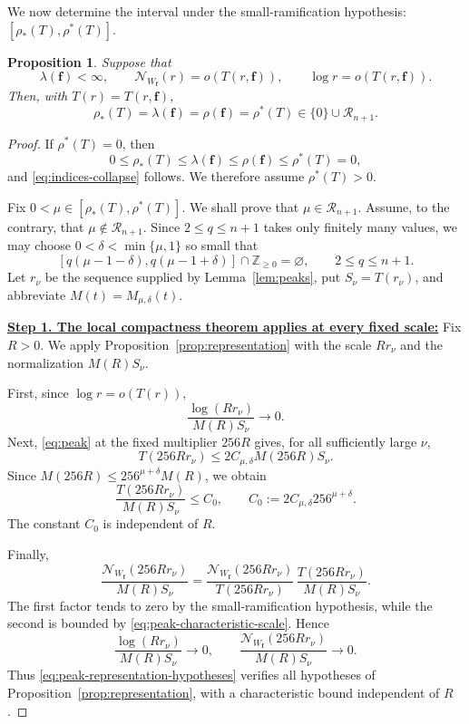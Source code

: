\documentclass[12pt,letterpaper,reqno]{amsart}
\newtheorem{prop}[thm]{Proposition}
\theoremstyle{definition}
\numberwithin{equation}{section}
\newcommand{\Z}{\mathbb Z}
\newcommand{\NN}{\mathcal N}
\newcommand{\Gn}{\mathcal R_{n+1}}
\newcommand{\fv}{\bm f}
\begin{document}
We now determine the interval under the small-ramification hypothesis:
$
[\rho_*(T),\rho^*(T)].
$

\begin{prop}\label{prop:indices}
Suppose that
\[
\lambda(\fv)<\infty,
\qquad
\NN_{W_{\fv}}(r)=o(T(r,\fv)),
\qquad
\log r=o(T(r,\fv)).
\]
Then, with \(T(r)=T(r,\fv)\),
\begin{equation}\label{eq:indices-collapse}
 \rho_*(T)
 =
 \lambda(\fv)
 =
 \rho(\fv)
 =
 \rho^*(T)
 \in
 \{0\}\cup\Gn.
\end{equation}
\end{prop}

\begin{proof}

If \(\rho^*(T)=0\), then
\[
0\leq
\rho_*(T)
\leq
\lambda(\fv)
\leq
\rho(\fv)
\leq
\rho^*(T)=0,
\]
and \eqref{eq:indices-collapse} follows. We therefore assume
\(\rho^*(T)>0\).

Fix
$
0<\mu\in[\rho_*(T),\rho^*(T)].
$
We shall prove that \(\mu\in\Gn\).
Assume, to the contrary, that \(\mu\notin\Gn\). Since
\(2\leq q\leq n+1\) takes only finitely many values, we may choose
\(0<\delta<\min\{\mu,1\}\) so small that
\begin{equation}\label{eq:no-integer-window}
 [q(\mu-1-\delta),q(\mu-1+\delta)]
 \cap\Z_{\geq0}
 =
 \varnothing,
 \qquad
 2\leq q\leq n+1.
\end{equation}
Let \(r_\nu\) be the sequence supplied by
Lemma~\ref{lem:peaks}, put \(S_\nu=T(r_\nu)\), and abbreviate
\(M(t)=M_{\mu,\delta}(t)\).


\medskip\noindent
\textbf{\underline{Step 1. The local compactness theorem applies at every fixed scale:}}
Fix \(R>0\). We apply Proposition~\ref{prop:representation} with
the scale \(Rr_\nu\) and the normalization \(M(R)S_\nu\).

First, since \(\log r=o(T(r))\),
\[
\frac{\log(Rr_\nu)}{M(R)S_\nu}\longrightarrow0.
\]
Next, \eqref{eq:peak} at the fixed multiplier \(256R\) gives, for all
sufficiently large \(\nu\),
\[
T(256Rr_\nu)
\leq
2C_{\mu,\delta}M(256R)S_\nu.
\]
Since
\(M(256R)\leq256^{\mu+\delta}M(R)\), we obtain
\begin{equation}\label{eq:peak-characteristic-scale}
 \frac{T(256Rr_\nu)}{M(R)S_\nu}
 \leq
 C_0,
 \qquad
 C_0:=2C_{\mu,\delta}256^{\mu+\delta}.
\end{equation}
The constant \(C_0\) is independent of \(R\).

Finally,
\[
\frac{\NN_{W_{\fv}}(256Rr_\nu)}{M(R)S_\nu}
=
\frac{\NN_{W_{\fv}}(256Rr_\nu)}
     {T(256Rr_\nu)}
\,
\frac{T(256Rr_\nu)}
     {M(R)S_\nu}.
\]
The first factor tends to zero by the small-ramification hypothesis,
while the second is bounded by \eqref{eq:peak-characteristic-scale}.
Hence
\begin{equation}\label{eq:peak-representation-hypotheses}
 \frac{\log(Rr_\nu)}{M(R)S_\nu}\longrightarrow0,
 \qquad
 \frac{\NN_{W_{\fv}}(256Rr_\nu)}
      {M(R)S_\nu}
 \longrightarrow0.
\end{equation}
Thus \eqref{eq:peak-representation-hypotheses} verifies all hypotheses
of Proposition~\ref{prop:representation},
with a characteristic bound independent of \(R\).



\end{proof}
\end{document}
